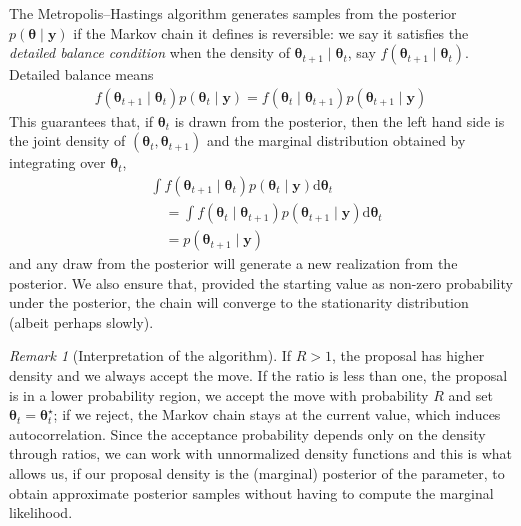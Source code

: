 \documentclass[
  11pt,
  letterpaper,
]{scrbook}
\theoremstyle{definition}
\theoremstyle{definition}
\theoremstyle{definition}
\theoremstyle{plain}
\theoremstyle{remark}
\newtheorem*{remark}{Remark}
\begin{document}
The Metropolis--Hastings algorithm generates samples from the posterior
\(p(\boldsymbol{\theta} \mid \boldsymbol{y})\) if the Markov chain it
defines is reversible: we say it satisfies the \emph{detailed balance
condition} when the density of
\(\boldsymbol{\theta}_{t+1} \mid \boldsymbol{\theta}_{t}\), say
\(f(\boldsymbol{\theta}_{t+1} \mid \boldsymbol{\theta}_{t})\). Detailed
balance means \begin{align*}
f(\boldsymbol{\theta}_{t+1} \mid \boldsymbol{\theta}_{t})p(\boldsymbol{\theta}_{t} \mid \boldsymbol{y}) = f(\boldsymbol{\theta}_{t} \mid \boldsymbol{\theta}_{t+1})p(\boldsymbol{\theta}_{t+1} \mid \boldsymbol{y})
\end{align*} This guarantees that, if \(\boldsymbol{\theta}_{t}\) is
drawn from the posterior, then the left hand side is the joint density
of \((\boldsymbol{\theta}_{t}, \boldsymbol{\theta}_{t+1})\) and the
marginal distribution obtained by integrating over
\(\boldsymbol{\theta}_{t}\), \begin{align*}
&\int f(\boldsymbol{\theta}_{t+1} \mid \boldsymbol{\theta}_{t})p(\boldsymbol{\theta}_{t} \mid \boldsymbol{y})\mathrm{d} \boldsymbol{\theta}_{t}
\\&\quad = \int f(\boldsymbol{\theta}_{t} \mid \boldsymbol{\theta}_{t+1})p(\boldsymbol{\theta}_{t+1} \mid \boldsymbol{y})\mathrm{d} \boldsymbol{\theta}_{t} 
\\&\quad= p(\boldsymbol{\theta}_{t+1} \mid \boldsymbol{y})
\end{align*} and any draw from the posterior will generate a new
realization from the posterior. We also ensure that, provided the
starting value as non-zero probability under the posterior, the chain
will converge to the stationarity distribution (albeit perhaps slowly).

\begin{remark}[Interpretation of the algorithm]

If \(R>1\), the proposal has higher density and we always accept the
move. If the ratio is less than one, the proposal is in a lower
probability region, we accept the move with probability \(R\) and set
\(\boldsymbol{\theta}_{t}=\boldsymbol{\theta}^{\star}_t\); if we reject,
the Markov chain stays at the current value, which induces
autocorrelation. Since the acceptance probability depends only on the
density through ratios, we can work with unnormalized density functions
and this is what allows us, if our proposal density is the (marginal)
posterior of the parameter, to obtain approximate posterior samples
without having to compute the marginal likelihood.

\end{remark}
\end{document}
